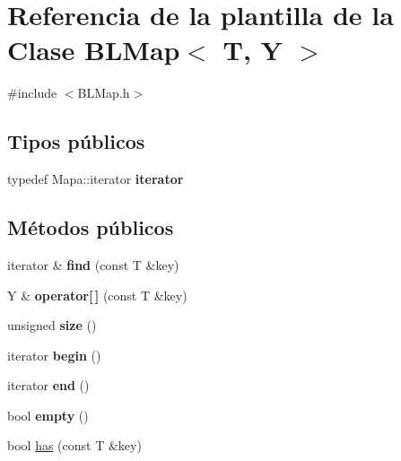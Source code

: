 \hypertarget{classBLMap}{\section{\-Referencia de la plantilla de la \-Clase \-B\-L\-Map$<$ \-T, \-Y $>$}
\label{classBLMap}
}


{\ttfamily \#include $<$\-B\-L\-Map.\-h$>$}

\subsection*{\-Tipos públicos}
\begin{DoxyCompactItemize}
\item 
\hypertarget{classBLMap_abbee6bf708121c75f3af858d85133e49}{typedef \-Mapa\-::iterator {\bfseries iterator}}\label{classBLMap_abbee6bf708121c75f3af858d85133e49}

\end{DoxyCompactItemize}
\subsection*{\-Métodos públicos}
\begin{DoxyCompactItemize}
\item 
\hypertarget{classBLMap_a3155f5c1416c98bfdf479c2c93779754}{iterator \& {\bfseries find} (const \-T \&key)}\label{classBLMap_a3155f5c1416c98bfdf479c2c93779754}

\item 
\hypertarget{classBLMap_a27aae52d3ee4931095251ddbc18f6b3a}{\-Y \& {\bfseries operator\mbox{[}$\,$\mbox{]}} (const \-T \&key)}\label{classBLMap_a27aae52d3ee4931095251ddbc18f6b3a}

\item 
\hypertarget{classBLMap_abfb1106e5ce4d15262690e6b49581720}{unsigned {\bfseries size} ()}\label{classBLMap_abfb1106e5ce4d15262690e6b49581720}

\item 
\hypertarget{classBLMap_a907a336b4d38e81300231d27b0d17e1c}{iterator {\bfseries begin} ()}\label{classBLMap_a907a336b4d38e81300231d27b0d17e1c}

\item 
\hypertarget{classBLMap_a98d826a28716f56d0df73d9b5d3015d6}{iterator {\bfseries end} ()}\label{classBLMap_a98d826a28716f56d0df73d9b5d3015d6}

\item 
\hypertarget{classBLMap_a0ab39b160a268c7147d931f8e4a50163}{bool {\bfseries empty} ()}\label{classBLMap_a0ab39b160a268c7147d931f8e4a50163}

\item 
bool \hyperlink{classBLMap_a422935060f7bb824eae5c7cc42cc9e16}{has} (const \-T \&key)
\end{DoxyCompactItemize}


